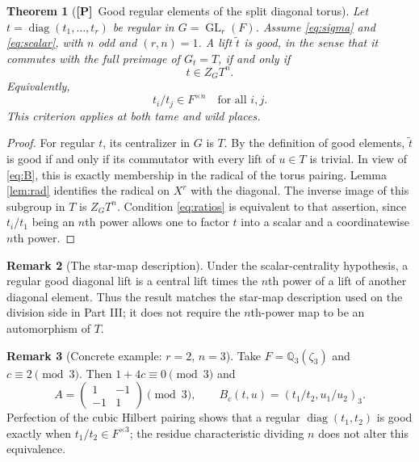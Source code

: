 \documentclass[11pt]{article}
\newcommand{\GL}{\operatorname{GL}}
\newcommand{\Ptag}{\textnormal{\textbf{[P]}}}
\theoremstyle{plain}
\newtheorem{theorem}{Theorem}[section]
\theoremstyle{definition}
\newtheorem{remark}[theorem]{Remark}
\begin{document}
\begin{theorem}[\Ptag\ Good regular elements of the split diagonal torus]\label{thm:split-good}
Let $t=\operatorname{diag}(t_1,\ldots,t_r)$ be regular in
$G=\GL_r(F)$.  Assume \eqref{eq:sigma} and \eqref{eq:scalar}, with
$n$ odd and $(r,n)=1$.  A lift $\widetilde t$ is good, in the sense
that it commutes with the full preimage of $G_t=T$, if and only if
\begin{equation}\label{eq:goodcrit}
 t\in Z_GT^n.
\end{equation}
Equivalently,
\begin{equation}\label{eq:ratios}
 t_i/t_j\in F^{\times n}\quad\text{for all }i,j.
\end{equation}
This criterion applies at both tame and wild places.
\end{theorem}
\begin{proof}
For regular $t$, its centralizer in $G$ is $T$.  By the definition
of good elements, $\widetilde t$ is good if and only if its commutator
with every lift of $u\in T$ is trivial.  In view of \eqref{eq:B}, this
is exactly membership in the radical of the torus pairing.  Lemma
\ref{lem:rad} identifies the radical on $X^r$ with the diagonal.
The inverse image of this subgroup in $T$ is $Z_GT^n$.
Condition \eqref{eq:ratios} is equivalent to that assertion, since
$t_i/t_1$ being an $n$th power allows one to factor $t$ into a scalar
and a coordinatewise $n$th power.
\end{proof}

\begin{remark}[The star-map description]
Under the scalar-centrality hypothesis, a regular good diagonal
lift is a central lift times the $n$th power of a lift of another
diagonal element.  Thus the result matches the star-map description
used on the division side in Part III; it does not require the
$n$th-power map to be an automorphism of $T$.
\end{remark}

\begin{remark}[Concrete example: $r=2$, $n=3$]
Take $F=\mathbb Q_3(\zeta_3)$ and $c\equiv2\pmod3$.  Then
$1+4c\equiv0\pmod3$ and
\[
 A=\begin{pmatrix}1&-1\\-1&1\end{pmatrix}\pmod3,
 \qquad
 B_c(t,u)=(t_1/t_2,u_1/u_2)_3.
\]
Perfection of the cubic Hilbert pairing shows that a regular
$\operatorname{diag}(t_1,t_2)$ is good exactly when
$t_1/t_2\in F^{\times3}$; the residue characteristic dividing $n$
does not alter this equivalence.
\end{remark}
\end{document}
